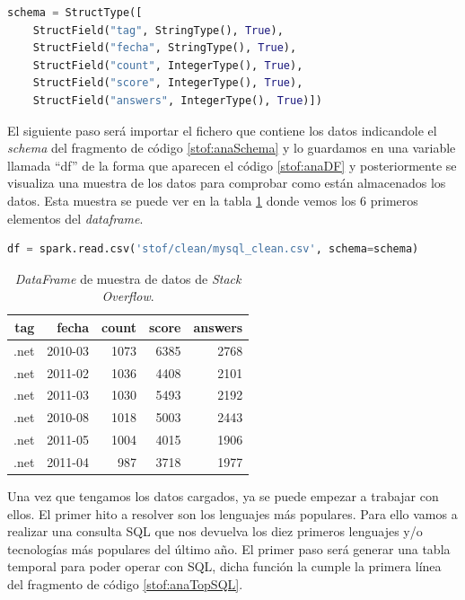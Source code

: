 \begin{lstlisting}[label=stof:anaSchema,language=Python,frame=single,caption=Código de declaración del \textit{schema} para lectura del \gls{CSV}.]
schema = StructType([
	StructField("tag", StringType(), True),
	StructField("fecha", StringType(), True),
	StructField("count", IntegerType(), True),
	StructField("score", IntegerType(), True),
	StructField("answers", IntegerType(), True)])
\end{lstlisting}

El siguiente paso será importar el fichero que contiene los datos indicandole el \textit{schema} del fragmento de código \ref{stof:anaSchema} y lo guardamos en una variable llamada ``df'' de la forma que aparecen el código \ref{stof:anaDF} y posteriormente se visualiza una muestra de los datos para comprobar como están almacenados los datos. Esta muestra se puede ver en la tabla \ref{stof:dfTable} donde vemos los $6$ primeros elementos del \textit{dataframe}.

\begin{lstlisting}[label=stof:anaDF,language=Python,frame=single,caption=Carga de un fichero \gls{CSV} con un esquema predefinido con el módulo \textit{Spark \gls{SQL}}.]
df = spark.read.csv('stof/clean/mysql_clean.csv', schema=schema)
\end{lstlisting}

\begin{table}[htp!]
	\centering
	\caption{\textit{DataFrame} de muestra de datos de \textit{Stack Overflow}.}
	\label{stof:dfTable}
	\begin{tabular}{@{}|r|r|r|r|r|@{}}
		\hline
		\textbf{tag}  & \textbf{fecha}   & \textbf{count} & \textbf{score} & \textbf{answers} \\ \hline
		.net & 2010-03 & 1073  & 6385  & 2768    \\
		.net & 2011-02 & 1036  & 4408  & 2101    \\
		.net & 2011-03 & 1030  & 5493  & 2192    \\
		.net & 2010-08 & 1018  & 5003  & 2443    \\
		.net & 2011-05 & 1004  & 4015  & 1906    \\
		.net & 2011-04 & 987   & 3718  & 1977    \\ 
		\hline
	\end{tabular}
\end{table}

Una vez que tengamos los datos cargados, ya se puede empezar a trabajar con ellos. El primer hito a resolver son los lenguajes más populares. Para ello vamos a realizar una consulta \gls{SQL} que nos devuelva los diez primeros lenguajes y/o tecnologías más populares del último año. El primer paso será generar una tabla temporal para poder operar con \gls{SQL}, dicha función la cumple la primera línea del fragmento de código \ref{stof:anaTopSQL}.

